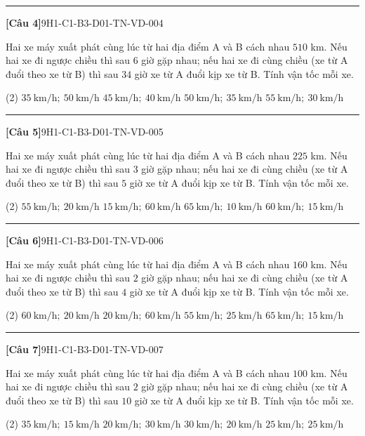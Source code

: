 \documentclass[12pt,a4paper]{article}
\newif\ifloigiai
\newenvironment{cauhoi}[2]{%
  \par\medskip\noindent\rule{\textwidth}{0.4pt}\par\nopagebreak
  \noindent\textbf{[#1]}\hfill{\scriptsize\ttfamily #2}\par\nopagebreak\smallskip}{\par}
\newcommand{\dapan}[1]{\ifloigiai\par\smallskip\noindent\textit{Đáp án:} \textbf{#1}\par\fi}
\begin{document}
\begin{cauhoi}{Câu 4}{9H1-C1-B3-D01-TN-VD-004}
Hai xe máy xuất phát cùng lúc từ hai địa điểm A và B cách nhau $510$ km. Nếu hai xe đi ngược chiều thì sau $6$ giờ gặp nhau; nếu hai xe đi cùng chiều (xe từ A đuổi theo xe từ B) thì sau $34$ giờ xe từ A đuổi kịp xe từ B. Tính vận tốc mỗi xe.
\begin{tasks}(2)
\task $35\ \text{km/h};\ 50\ \text{km/h}$
\task $45\ \text{km/h};\ 40\ \text{km/h}$
\task $50\ \text{km/h};\ 35\ \text{km/h}$
\task $55\ \text{km/h};\ 30\ \text{km/h}$
\end{tasks}
\dapan{C}
\end{cauhoi}
\begin{cauhoi}{Câu 5}{9H1-C1-B3-D01-TN-VD-005}
Hai xe máy xuất phát cùng lúc từ hai địa điểm A và B cách nhau $225$ km. Nếu hai xe đi ngược chiều thì sau $3$ giờ gặp nhau; nếu hai xe đi cùng chiều (xe từ A đuổi theo xe từ B) thì sau $5$ giờ xe từ A đuổi kịp xe từ B. Tính vận tốc mỗi xe.
\begin{tasks}(2)
\task $55\ \text{km/h};\ 20\ \text{km/h}$
\task $15\ \text{km/h};\ 60\ \text{km/h}$
\task $65\ \text{km/h};\ 10\ \text{km/h}$
\task $60\ \text{km/h};\ 15\ \text{km/h}$
\end{tasks}
\dapan{D}
\end{cauhoi}
\begin{cauhoi}{Câu 6}{9H1-C1-B3-D01-TN-VD-006}
Hai xe máy xuất phát cùng lúc từ hai địa điểm A và B cách nhau $160$ km. Nếu hai xe đi ngược chiều thì sau $2$ giờ gặp nhau; nếu hai xe đi cùng chiều (xe từ A đuổi theo xe từ B) thì sau $4$ giờ xe từ A đuổi kịp xe từ B. Tính vận tốc mỗi xe.
\begin{tasks}(2)
\task $60\ \text{km/h};\ 20\ \text{km/h}$
\task $20\ \text{km/h};\ 60\ \text{km/h}$
\task $55\ \text{km/h};\ 25\ \text{km/h}$
\task $65\ \text{km/h};\ 15\ \text{km/h}$
\end{tasks}
\dapan{A}
\end{cauhoi}
\begin{cauhoi}{Câu 7}{9H1-C1-B3-D01-TN-VD-007}
Hai xe máy xuất phát cùng lúc từ hai địa điểm A và B cách nhau $100$ km. Nếu hai xe đi ngược chiều thì sau $2$ giờ gặp nhau; nếu hai xe đi cùng chiều (xe từ A đuổi theo xe từ B) thì sau $10$ giờ xe từ A đuổi kịp xe từ B. Tính vận tốc mỗi xe.
\begin{tasks}(2)
\task $35\ \text{km/h};\ 15\ \text{km/h}$
\task $20\ \text{km/h};\ 30\ \text{km/h}$
\task $30\ \text{km/h};\ 20\ \text{km/h}$
\task $25\ \text{km/h};\ 25\ \text{km/h}$
\end{tasks}
\dapan{C}
\end{cauhoi}
\end{document}
